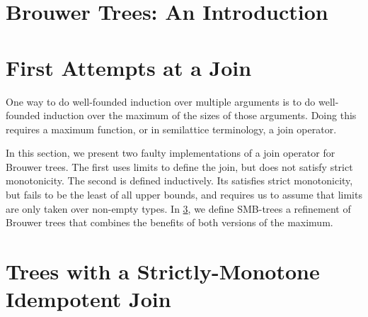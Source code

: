 



\section{Brouwer Trees: An Introduction}




\section{First Attempts at a Join}
\label{sec:join}
One way to do well-founded induction over multiple arguments is to do well-founded
induction over the maximum of the sizes of those arguments. Doing this requires
a maximum function, or in semilattice terminology, a join operator.

In this section, we present two faulty implementations of a join operator
for Brouwer trees. The first uses limits to define the join, but does not satisfy
strict monotonicity. The second is defined inductively. Its satisfies
strict monotonicity, but fails to be the least of all upper bounds,
and requires us to assume that limits are only taken over non-empty types.
In \cref{sec:strict}, we define SMB-trees a refinement of Brouwer trees that combines
the benefits of both versions of the maximum.
  
  

  \section{Trees with a Strictly-Monotone Idempotent Join}
  \label{sec:strict}









